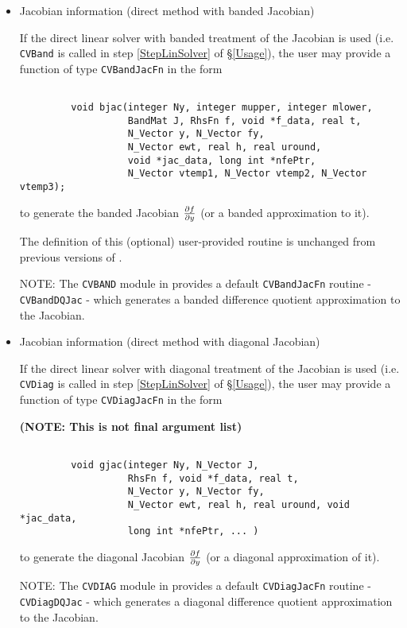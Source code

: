 \begin{itemize}
\item Jacobian information (direct method with banded Jacobian)

If the direct linear solver with banded treatment of the Jacobian is used 
(i.e. {\tt CVBand} is called in step \ref{StepLinSolver} of \S\ref{Usage}), 
the user may provide a function of type {\tt CVBandJacFn} in the form
\begin{verbatim}

         void bjac(integer Ny, integer mupper, integer mlower, 
                   BandMat J, RhsFn f, void *f_data, real t, 
                   N_Vector y, N_Vector fy,
                   N_Vector ewt, real h, real uround, 
                   void *jac_data, long int *nfePtr, 
                   N_Vector vtemp1, N_Vector vtemp2, N_Vector vtemp3); 

\end{verbatim}
to generate the banded Jacobian $\frac{\partial f}{\partial y}$ (or a banded approximation to it).

The definition of this (optional) user-provided routine is unchanged from
previous versions of {\code}.

NOTE: The {\tt CVBAND} module in {\codeS} provides a default 
{\tt CVBandJacFn} routine - {\tt CVBandDQJac} - which generates a banded
difference quotient approximation to the Jacobian.

\item Jacobian information (direct method with diagonal Jacobian)

If the direct linear solver with diagonal treatment of the Jacobian is used 
(i.e. {\tt CVDiag} is called in step \ref{StepLinSolver} of \S\ref{Usage}), 
the user may provide a function of type {\tt CVDiagJacFn} in the form

{\bf (NOTE: This is not final argument list)}

\begin{verbatim}

         void gjac(integer Ny, N_Vector J,
                   RhsFn f, void *f_data, real t, 
                   N_Vector y, N_Vector fy,
                   N_Vector ewt, real h, real uround, void *jac_data,
                   long int *nfePtr, ... )

\end{verbatim}
to generate the diagonal Jacobian $\frac{\partial f}{\partial y}$ (or a diagonal approximation of it).

NOTE: The {\tt CVDIAG} module in {\codeS} provides a default 
{\tt CVDiagJacFn} routine - {\tt CVDiagDQJac} - which generates a diagonal
difference quotient approximation to the Jacobian.


\end{itemize}
